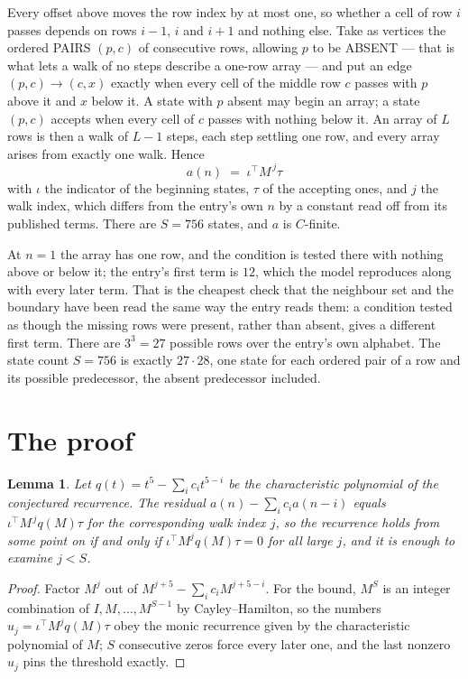 \documentclass[11pt,a4paper]{article}
\theoremstyle{plain}
\newtheorem{lemma}[theorem]{Lemma}
\theoremstyle{definition}
\begin{document}
Every offset above moves the row index by at most one, so whether a cell of row $i$ passes
depends on rows $i-1$, $i$ and $i+1$ and nothing else. Take as vertices the ordered PAIRS
$(p,c)$ of consecutive rows, allowing $p$ to be ABSENT --- that is what lets a walk of no steps
describe a one-row array --- and put an edge $(p,c)\to(c,x)$ exactly when every cell of the
middle row $c$ passes with $p$ above it and $x$ below it. A state with $p$ absent may begin an
array; a state $(p,c)$ accepts when every cell of $c$ passes with nothing below it. An array of
$L$ rows is then a walk of $L-1$ steps, each step settling one row, and every array arises from
exactly one walk. Hence
\[
a(n)\;=\;\iota^{\!\top}M^{\,j}\tau
\]
with $\iota$ the indicator of the beginning states, $\tau$ of the accepting ones, and $j$ the
walk index, which differs from the entry's own $n$ by a constant read off from its published
terms. There are $S=756$ states, and $a$ is $C$-finite.

At $n=1$ the array has one row, and
the condition is tested there with nothing above or below it; the entry's first term is
$12$, which the model reproduces along with every later term. That is the cheapest check
that the neighbour set and the boundary have been read the same way the entry reads them: a
condition tested as though the missing rows were present, rather than absent, gives a different
first term. There are $3^{3}=27$ possible rows over the entry's own alphabet. The state count $S=756$ is exactly $27\cdot28$,
one state for each ordered pair of a row and its possible predecessor, the absent predecessor
included.

\section{The proof}

\begin{lemma}\label{lem:crit}
Let $q(t)=t^{5}-\sum_i c_it^{5-i}$ be the characteristic polynomial of the
conjectured recurrence. The residual $a(n)-\sum_ic_ia(n-i)$ equals
$\iota^{\!\top}M^{\,j}q(M)\tau$ for the corresponding walk index $j$, so the recurrence
holds from some point on if and only if $\iota^{\!\top}M^{j}q(M)\tau=0$ for all large $j$,
and it is enough to examine $j<S$.
\end{lemma}

\begin{proof}
Factor $M^{j}$ out of $M^{j+5}-\sum_ic_iM^{j+5-i}$. For the bound, $M^{S}$
is an integer combination of $I,M,\dots,M^{S-1}$ by Cayley--Hamilton, so the numbers
$u_j=\iota^{\!\top}M^{j}q(M)\tau$ obey the monic recurrence given by the characteristic
polynomial of $M$; $S$ consecutive zeros force every later one, and the last nonzero $u_j$
pins the threshold exactly.
\end{proof}
\end{document}
